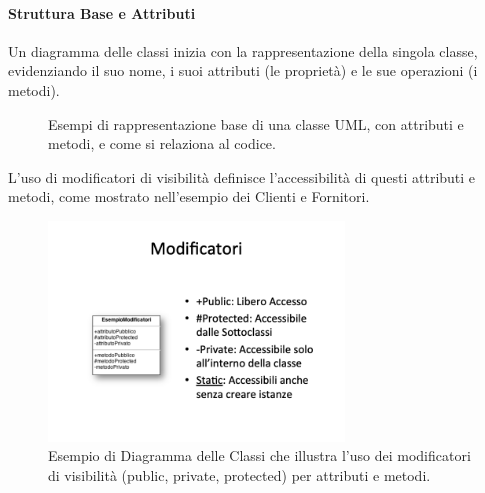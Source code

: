 \paragraph{Struttura Base e Attributi}
Un diagramma delle classi inizia con la rappresentazione della singola classe, evidenziando il suo nome, i suoi attributi (le proprietà) e le sue operazioni (i metodi).
\begin{figure}[h!]
    \centering
    \quad
    \caption{Esempi di rappresentazione base di una classe UML, con attributi e metodi, e come si relaziona al codice.}
    \label{fig:struttura_base_classi}
\end{figure}

L'uso di modificatori di visibilità definisce l'accessibilità di questi attributi e metodi, come mostrato nell'esempio dei Clienti e Fornitori.
\begin{figure}[h!]
    \centering
    \includegraphics[width=0.7\textwidth]{immagini/uml_class_modificatori_visibilita.png}
    \caption{Esempio di Diagramma delle Classi che illustra l'uso dei modificatori di visibilità (public, private, protected) per attributi e metodi.}
    \label{fig:class_modificatori}
\end{figure}

